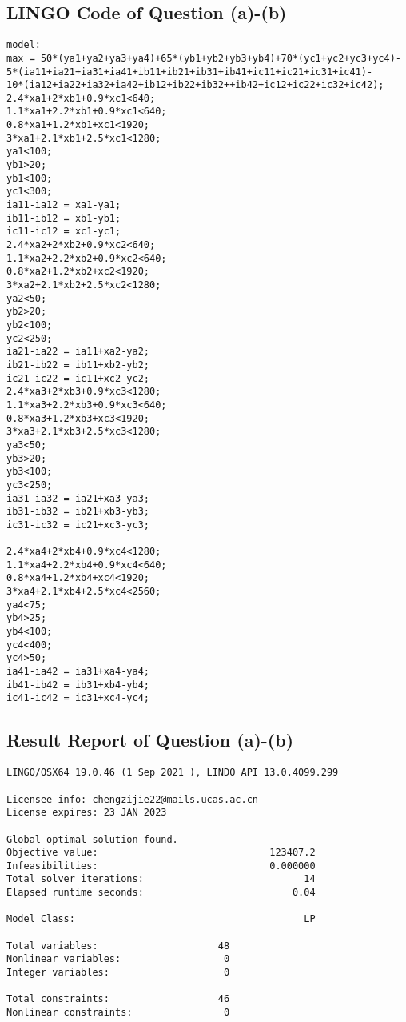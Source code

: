 \documentclass[12pt]{article}
\begin{document}
\begin{appendices}
\subsection{LINGO Code of Question (a)-(b)}
\begin{lstlisting}
model:
max = 50*(ya1+ya2+ya3+ya4)+65*(yb1+yb2+yb3+yb4)+70*(yc1+yc2+yc3+yc4)-
5*(ia11+ia21+ia31+ia41+ib11+ib21+ib31+ib41+ic11+ic21+ic31+ic41)-
10*(ia12+ia22+ia32+ia42+ib12+ib22+ib32++ib42+ic12+ic22+ic32+ic42);
2.4*xa1+2*xb1+0.9*xc1<640;
1.1*xa1+2.2*xb1+0.9*xc1<640;
0.8*xa1+1.2*xb1+xc1<1920;
3*xa1+2.1*xb1+2.5*xc1<1280;
ya1<100;
yb1>20;
yb1<100;
yc1<300;
ia11-ia12 = xa1-ya1;
ib11-ib12 = xb1-yb1;
ic11-ic12 = xc1-yc1;
2.4*xa2+2*xb2+0.9*xc2<640;
1.1*xa2+2.2*xb2+0.9*xc2<640;
0.8*xa2+1.2*xb2+xc2<1920;
3*xa2+2.1*xb2+2.5*xc2<1280;
ya2<50;
yb2>20;
yb2<100;
yc2<250;
ia21-ia22 = ia11+xa2-ya2;
ib21-ib22 = ib11+xb2-yb2;
ic21-ic22 = ic11+xc2-yc2;
2.4*xa3+2*xb3+0.9*xc3<1280;
1.1*xa3+2.2*xb3+0.9*xc3<640;
0.8*xa3+1.2*xb3+xc3<1920;
3*xa3+2.1*xb3+2.5*xc3<1280;
ya3<50;
yb3>20;
yb3<100;
yc3<250;
ia31-ia32 = ia21+xa3-ya3;
ib31-ib32 = ib21+xb3-yb3;
ic31-ic32 = ic21+xc3-yc3;

2.4*xa4+2*xb4+0.9*xc4<1280;
1.1*xa4+2.2*xb4+0.9*xc4<640;
0.8*xa4+1.2*xb4+xc4<1920;
3*xa4+2.1*xb4+2.5*xc4<2560;
ya4<75;
yb4>25;
yb4<100;
yc4<400;
yc4>50;
ia41-ia42 = ia31+xa4-ya4;
ib41-ib42 = ib31+xb4-yb4;
ic41-ic42 = ic31+xc4-yc4;
\end{lstlisting}
\subsection{Result Report of Question (a)-(b)}
\begin{lstlisting}
LINGO/OSX64 19.0.46 (1 Sep 2021 ), LINDO API 13.0.4099.299

Licensee info: chengzijie22@mails.ucas.ac.cn  
License expires: 23 JAN 2023

Global optimal solution found.
Objective value:                              123407.2
Infeasibilities:                              0.000000
Total solver iterations:                            14
Elapsed runtime seconds:                          0.04

Model Class:                                        LP

Total variables:                     48
Nonlinear variables:                  0
Integer variables:                    0

Total constraints:                   46
Nonlinear constraints:                0


\end{lstlisting}
\end{appendices}
\end{document}
